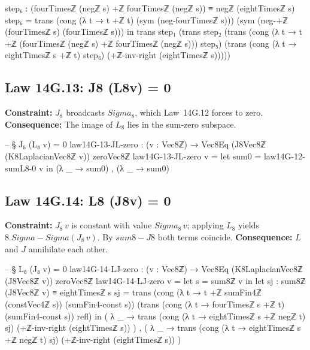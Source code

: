 \documentclass[11pt,a4paper]{book}
\def\Sigma{Sigma}%
\def\cdot{.}%
\def\texttt#1{#1}%
\def\texorpdfstring#1#2{#2}%
\begin{document}
\begin{code}
    step₆ : (fourTimesℤ (negℤ s) +ℤ fourTimesℤ (negℤ s)) ≡ negℤ (eightTimesℤ s)
    step₆ =
      trans
        (cong (λ t → t +ℤ t) (sym (neg-fourTimesℤ s)))
        (sym (neg-+ℤ (fourTimesℤ s) (fourTimesℤ s)))
  in
  trans
    step₁
    (trans
      step₂
      (trans
        (cong (λ t → t +ℤ (fourTimesℤ (negℤ s) +ℤ fourTimesℤ (negℤ s))) step₅)
        (trans
          (cong (λ t → eightTimesℤ s +ℤ t) step₆)
          (+ℤ-inv-right (eightTimesℤ s)))))
\end{code}

\subsection{Law 14G.13: \texorpdfstring{$J_8 (L_8\,v) = 0$}{J8 (L8v) = 0}}

\textbf{Constraint:} $J_8$ broadcasts $\Sigma_8$, which Law~14G.12 forces to zero.
\textbf{Consequence:} The image of $L_8$ lies in the sum-zero subspace.

\begin{code}
-- § J₈ (L₈ v) = 0
law14G-13-JL-zero : (v : Vec8ℤ) → Vec8Eq (J8Vec8ℤ (K8LaplacianVec8ℤ v)) zeroVec8ℤ
law14G-13-JL-zero v =
  let sum0 = law14G-12-sumL8-0 v in
  (λ _ → sum0) , (λ _ → sum0)
\end{code}

\subsection{Law 14G.14: \texorpdfstring{$L_8 (J_8\,v) = 0$}{L8 (J8v) = 0}}

\textbf{Constraint:} $J_8\,v$ is constant with value $\Sigma_8\,v$; applying $L_8$
yields $8 \cdot \Sigma - \Sigma(J_8\,v)$.  By $\texttt{sum8-J8}$ both terms coincide.
\textbf{Consequence:} $L$ and $J$ annihilate each other.

\begin{code}
-- § L₈ (J₈ v) = 0
law14G-14-LJ-zero : (v : Vec8ℤ) → Vec8Eq (K8LaplacianVec8ℤ (J8Vec8ℤ v)) zeroVec8ℤ
law14G-14-LJ-zero v =
  let s = sum8ℤ v in
  let sj : sum8ℤ (J8Vec8ℤ v) ≡ eightTimesℤ s
      sj =
        trans
          (cong (λ t → t +ℤ sumFin4ℤ (constVec4ℤ s)) (sumFin4-const s))
          (trans
            (cong (λ t → fourTimesℤ s +ℤ t) (sumFin4-const s))
            refl)
  in
  ( λ _ →
      trans
        (cong (λ t → eightTimesℤ s +ℤ negℤ t) sj)
        (+ℤ-inv-right (eightTimesℤ s))
  ) ,
  ( λ _ →
      trans
        (cong (λ t → eightTimesℤ s +ℤ negℤ t) sj)
        (+ℤ-inv-right (eightTimesℤ s))
  )
\end{code}
\end{document}
